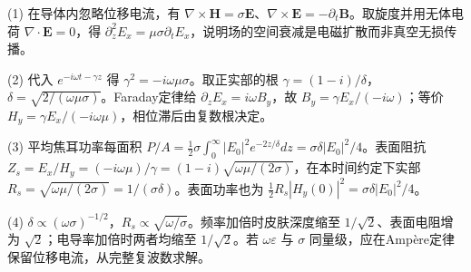 (1) 在导体内忽略位移电流，有 \(\nabla\times\mathbf H=\sigma\mathbf E\)、\(\nabla\times\mathbf E=-\partial_t\mathbf B\)。取旋度并用无体电荷 \(\nabla\cdot\mathbf E=0\)，得 \(\partial_z^2E_x=\mu\sigma\partial_tE_x\)，说明场的空间衰减是电磁扩散而非真空无损传播。

(2) 代入 \(e^{-i\omega t-\gamma z}\) 得 \(\gamma^2=-i\omega\mu\sigma\)。取正实部的根 \(\boxed{\gamma=(1-i)/\delta}\)，\(\delta=\sqrt{2/(\omega\mu\sigma)}\)。Faraday定律给 \(\partial_zE_x=i\omega B_y\)，故 \(B_y=\gamma E_x/(-i\omega)\)；等价 \(H_y=\gamma E_x/(-i\omega\mu)\)，相位滞后由复数根决定。

(3) 平均焦耳功率每面积 \(P/A=\frac12\sigma\int_0^\infty|E_0|^2e^{-2z/\delta}dz=\sigma\delta|E_0|^2/4\)。表面阻抗 \(Z_s=E_x/H_y=(-i\omega\mu)/\gamma=(1-i)\sqrt{\omega\mu/(2\sigma)}\)，在本时间约定下实部 \(R_s=\sqrt{\omega\mu/(2\sigma)}=1/(\sigma\delta)\)。表面功率也为 \(\frac12R_s|H_y(0)|^2=\sigma\delta|E_0|^2/4\)。

(4) \(\delta\propto(\omega\sigma)^{-1/2}\)，\(R_s\propto\sqrt{\omega/\sigma}\)。频率加倍时皮肤深度缩至 \(1/\sqrt2\)、表面电阻增为 \(\sqrt2\)；电导率加倍时两者均缩至 \(1/\sqrt2\)。若 \(\omega\varepsilon\) 与 \(\sigma\) 同量级，应在Ampère定律保留位移电流，从完整复波数求解。
